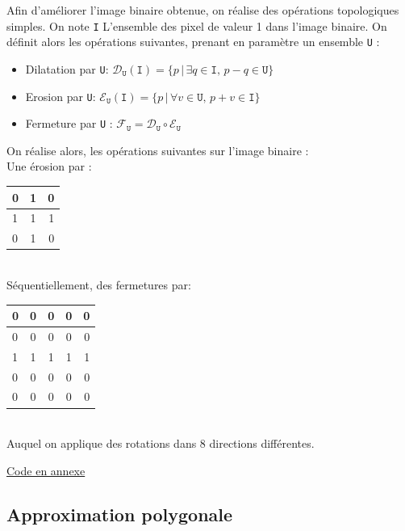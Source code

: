 \documentclass{article}
\begin{document}
\begin{multicols}{2}
Afin d'améliorer l'image binaire obtenue, on réalise des opérations topologiques simples. On note \texttt{I} L'ensemble des pixel de valeur 1 dans l'image binaire. On définit alors les opérations suivantes, prenant en paramètre un ensemble \texttt{U} :
\begin{itemize}
	\item Dilatation par \texttt{U}: $\mathcal{D}_\mathtt{U}(\mathtt{I}) = \{p \, | \, \exists q \in \mathtt{I}, \, {p-q} \in \mathtt{U}\}$
	\item Erosion par \texttt{U}: $\mathcal{E}_\mathtt{U}(\mathtt{I}) = \{p \, | \, \forall v \in \mathtt{U}, \, {p+v} \in \mathtt{I}\}$
	\item Fermeture par \texttt{U} : $\mathcal{F}_\mathtt{U} = \mathcal{D}_\mathtt{U} \circ \mathcal{E}_\mathtt{U}$
\end{itemize}
On réalise alors, les opérations suivantes sur l'image binaire :\\
Une érosion par :\\
\medskip
\begin{tabular}{|l|c|r|}
	\hline
	0 & 1 & 0 \\ \hline
	1 & 1 & 1 \\ \hline
	0 & 1 & 0 \\
	\hline
\end{tabular}\\
\medskip
Séquentiellement, des fermetures par:\\
\medskip
\begin{tabular}{|l|c|c|c|r|}
	\hline
	0 & 0 & 0 & 0 & 0 \\ \hline
	0 & 0 & 0 & 0 & 0 \\ \hline
	1 & 1 & 1 & 1 & 1 \\ \hline
	0 & 0 & 0 & 0 & 0 \\ \hline
	0 & 0 & 0 & 0 & 0 \\
	\hline
\end{tabular}\\
\medskip
Auquel on applique des rotations dans 8 directions différentes.

\hyperref[Topo]{Code en annexe}

\subsection{Approximation polygonale}


\end{multicols}
\end{document}
